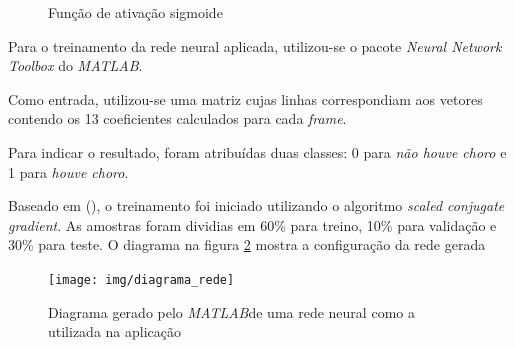 \documentclass[10pt,a4paper]{article}
\begin{document}
\begin{multicols*}{2}
\begin{figure}[H]
\centering
{}%
\caption{Função de ativação sigmoide}	
\label{fig:sigmoide}
\end{figure}

Para o treinamento da rede neural aplicada, utilizou-se o pacote \textit{Neural Network Toolbox} do \textit{MATLAB}\textregistered.

Como entrada, utilizou-se uma matriz cujas linhas correspondiam aos vetores contendo os 13 coeficientes calculados para cada \textit{frame}.

Para indicar o resultado, foram atribuídas duas classes: 0 para \textit{não houve choro} e 1 para \textit{houve choro}.

Baseado em (\cite{garcia2003}), o treinamento foi iniciado utilizando o algoritmo \textit{scaled conjugate gradient}. As amostras foram dividias em 60\% para treino, 10\% para validação e 30\% para teste. O diagrama na figura \ref{fig:dia_nn} mostra a configuração da rede gerada

\begin{figure}[H]
	\centering
	\texttt{[image: img/diagrama\_rede]}
	\caption{Diagrama gerado pelo \textit{MATLAB}\textregistered de uma rede neural como a utilizada na aplicação}
	\label{fig:dia_nn}
\end{figure}


\end{multicols*}
\end{document}
